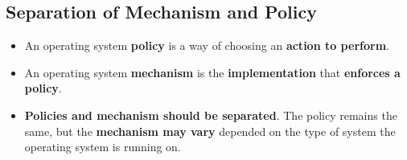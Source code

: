 \documentclass[16pt]{article}
\begin{document}
    \subsection*{Separation of Mechanism and Policy}
    \begin{itemize}
        \item An operating system \textbf{policy} is a way of choosing an \textbf{action to perform}.
        \item An operating system \textbf{mechanism} is the \textbf{implementation} that \textbf{enforces a policy}.
        \item \textbf{Policies and mechanism should be separated}. The policy remains the same, but the \textbf{mechanism may vary} depended on the type of system the operating system is running on.
    \end{itemize}
\end{document}
